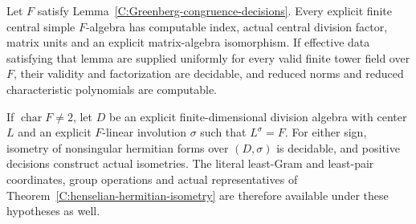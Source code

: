 \begin{corollary}
\label{C:Greenberg-valued-algebra-decisions}
Let $F$ satisfy Lemma~\ref{C:Greenberg-congruence-decisions}.
Every explicit finite central simple $F$-algebra has computable
index, actual central division factor, matrix units and an explicit
matrix-algebra isomorphism.  If effective data satisfying that lemma
are supplied uniformly for every valid finite tower field over $F$, their validity
and factorization are decidable, and reduced norms and reduced
characteristic polynomials are computable.

If $\operatorname{char}F\ne2$, let $D$ be an explicit finite-dimensional
division algebra with center $L$ and an explicit $F$-linear involution
$\sigma$ such that $L^\sigma=F$.  For either sign, isometry of
nonsingular hermitian forms over $(D,\sigma)$ is decidable, and
positive decisions construct actual isometries.  The literal
least-Gram and least-pair coordinates, group operations and actual
representatives of Theorem~\ref{C:henselian-hermitian-isometry}
are therefore available under these hypotheses as well.
\end{corollary}
